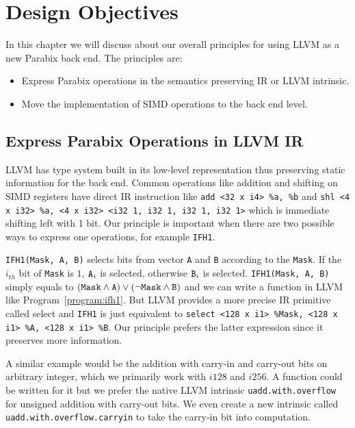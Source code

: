 %
%

\chapter{Design Objectives}
\label{three}

In this chapter we will discuss about our overall principles for using LLVM as a new Parabix back end. The principles are:

\begin{itemize}
    \item Express Parabix operations in the semantics preserving IR or LLVM intrinsic.
    \item Move the implementation of SIMD operations to the back end level.
\end{itemize}

\section{Express Parabix Operations in LLVM IR}

LLVM has type system built in its low-level representation thus preserving static information for the back end. Common operations like addition and shifting on SIMD registers have direct IR instruction like \verb|add <32 x i4> %a, %b| and \verb|shl <4 x i32> %a, <4 x i32> <i32 1, i32 1, i32 1, i32 1>| which is immediate shifting left with 1 bit. Our principle is important when there are two possible ways to express one operations, for example {\tt IFH1}.

{\tt IFH1(Mask, A, B)} selects bits from vector {\tt A} and {\tt B} according to the {\tt Mask}. If the $i_{th}$ bit of {\tt Mask} is $1$, $\text{\tt A}_i$ is selected, otherwise $\text{\tt B}_i$ is selected. {\tt IFH1(Mask, A, B)} simply equals to $(\text{\tt Mask} \land \text{\tt A}) \lor (\lnot \text{\tt Mask} \land \text{\tt B})$ and we can write a function in LLVM like Program~\ref{program:ifh1}. But LLVM provides a more precise IR primitive called select and {\tt IFH1} is just equivalent to {\tt select <128 x i1> \%Mask, <128 x i1> \%A, <128 x i1> \%B}. Our principle prefers the latter expression since it preserves more information.

A similar example would be the addition with carry-in and carry-out bits on arbitrary integer, which we primarily work with $i128$ and $i256$. A function could be written for it but we prefer the native LLVM intrinsic {\tt uadd.with.overflow} for unsigned addition with carry-out bits. We even create a new intrinsic called {\tt uadd.with.overflow.carryin} to take the carry-in bit into computation.

